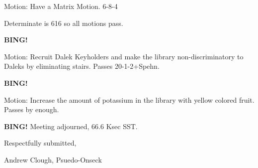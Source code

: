\documentclass[10pt]{article}
\newcommand{\bing}{{\bf BING!} }
\begin{document}
Motion:  Have a Matrix Motion. 6-8-4

Determinate is 616 so all motions pass.

\bing

Motion: Recruit Dalek Keyholders and make the library non-discriminatory to Daleks
by eliminating stairs.  Passes 20-1-2+Spehn.

\bing

Motion:  Increase the amount of potassium in the library with yellow colored fruit.  Passes by enough.

\bing
\noindent
Meeting adjourned, 66.6 Ksec SST.

\vspace{18pt}

\centerline{Respectfully submitted,}
\centerline{Andrew Clough, Psuedo-Onseck}
\end{document}
